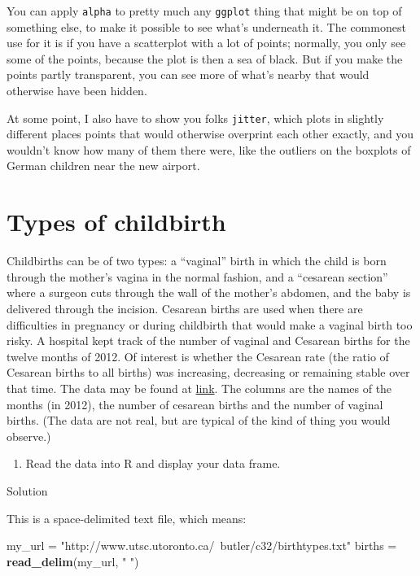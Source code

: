 \documentclass[]{tufte-book}
\newenvironment{Shaded}{}{}
\newcommand{\KeywordTok}[1]{\textcolor[rgb]{0.00,0.44,0.13}{\textbf{#1}}}
\newcommand{\NormalTok}[1]{#1}
\newcommand{\StringTok}[1]{\textcolor[rgb]{0.25,0.44,0.63}{#1}}
\providecommand{\tightlist}{%
  \setlength{\itemsep}{0pt}\setlength{\parskip}{0pt}}
\theoremstyle{definition}
\theoremstyle{definition}
\theoremstyle{definition}
\theoremstyle{remark}
\begin{document}
You can apply \texttt{alpha} to pretty much any \texttt{ggplot} thing
that might be on top of something else, to make it possible to see
what's underneath it. The commonest use for it is if you have a
scatterplot with a lot of points; normally, you only see some of the
points, because the plot is then a sea of black. But if you make the
points partly transparent, you can see more of what's nearby that would
otherwise have been hidden.

At some point, I also have to show you folks \texttt{jitter}, which
plots in slightly different places points that would otherwise overprint
each other exactly, and you wouldn't know how many of them there were,
like the outliers on the boxplots of German children near the new
airport.

\hypertarget{types-of-childbirth}{%
\section{Types of childbirth}\label{types-of-childbirth}}

Childbirths can be of two types: a ``vaginal'' birth in which the child
is born through the mother's vagina in the normal fashion, and a
``cesarean section'' where a surgeon cuts through the wall of the
mother's abdomen, and the baby is delivered through the incision.
Cesarean births are used when there are difficulties in pregnancy or
during childbirth that would make a vaginal birth too risky. A hospital
kept track of the number of vaginal and Cesarean births for the twelve
months of 2012. Of interest is whether the Cesarean rate (the ratio of
Cesarean births to all births) was increasing, decreasing or remaining
stable over that time. The data may be found at
\href{http://www.utsc.utoronto.ca/~butler/c32/birthtypes.txt}{link}. The
columns are the names of the months (in 2012), the number of cesarean
births and the number of vaginal births. (The data are not real, but are
typical of the kind of thing you would observe.)

\begin{enumerate}
\def\labelenumi{(\alph{enumi})}
\tightlist
\item
  Read the data into R and display your data frame.
\end{enumerate}

Solution

This is a space-delimited text file, which means:

\begin{Shaded}
\begin{Highlighting}[]
\NormalTok{my_url =}\StringTok{ "http://www.utsc.utoronto.ca/~butler/c32/birthtypes.txt"}
\NormalTok{births =}\StringTok{ }\KeywordTok{read_delim}\NormalTok{(my_url, }\StringTok{" "}\NormalTok{)}
\end{Highlighting}
\end{Shaded}
\end{document}
